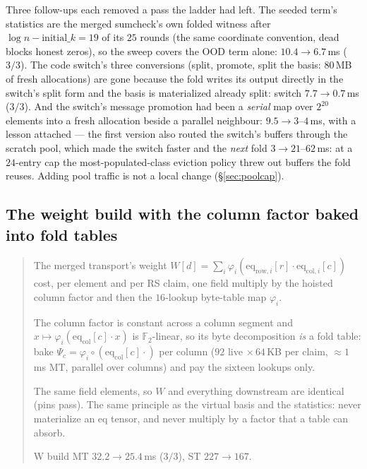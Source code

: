 \documentclass[11pt]{article}
\newcommand{\Ftwo}{\mathbb{F}_2}
\newcommand{\eq}{\mathrm{eq}}
\newenvironment{optsummary}{%
  \begin{quote}\small
  \begin{description}
  \setlength{\itemsep}{1pt}\setlength{\parsep}{0pt}\setlength{\topsep}{2pt}
}{%
  \end{description}
  \end{quote}
}
\begin{document}
Three follow-ups each removed a pass the ladder had left. The seeded
term's statistics are the merged sumcheck's own folded witness after
$\log n - \mathrm{initial}\_k = 19$ of its $25$ rounds (the same
coordinate convention, dead blocks honest zeros), so the sweep covers
the OOD term alone: $10.4\to6.7\,$ms ($3/3$). The code switch's three
conversions (split, promote, split the basis: $80\,$MB of fresh
allocations) are gone because the fold writes its output directly in
the switch's split form and the basis is materialized already split:
switch $7.7\to0.7\,$ms ($3/3$). And the switch's message promotion had
been a \emph{serial} map over $2^{20}$ elements into a fresh allocation
beside a parallel neighbour: $9.5\to3$--$4\,$ms, with a lesson attached
--- the first version also routed the switch's buffers through the
scratch pool, which made the switch faster and the \emph{next} fold
$3\to21$--$62\,$ms: at a $24$-entry cap the most-populated-class
eviction policy threw out buffers the fold reuses. Adding pool traffic
is not a local change (\S\ref{sec:poolcap}).

\subsection{The weight build with the column factor baked into fold tables}\label{sec:bakedw}

\begin{optsummary}
\item[Baseline:] The merged transport's weight $W[d] = \sum_i \varphi_i(\eq_{\mathrm{row},i}[r]\cdot\eq_{\mathrm{col},i}[c])$ cost, per element and per RS claim, one field multiply by the hoisted column factor and then the $16$-lookup byte-table map $\varphi_i$.
\item[Improvement:] The column factor is constant across a column segment and $x\mapsto\varphi_i(\eq_{\mathrm{col}}[c]\cdot x)$ is $\Ftwo$-linear, so its byte decomposition \emph{is} a fold table: bake $\Psi_c = \varphi_i\circ(\eq_{\mathrm{col}}[c]\cdot)$ per column ($92$ live $\times\,64\,$KB per claim, $\approx1\,$ms MT, parallel over columns) and pay the sixteen lookups only.
\item[Mechanism:] The same field elements, so $W$ and everything downstream are identical (pins pass). The same principle as the virtual basis and the statistics: never materialize an eq tensor, and never multiply by a factor that a table can absorb.
\item[Result:] W build MT $32.2\to25.4\,$ms ($3/3$), ST $227\to167$.
\end{optsummary}
\end{document}
